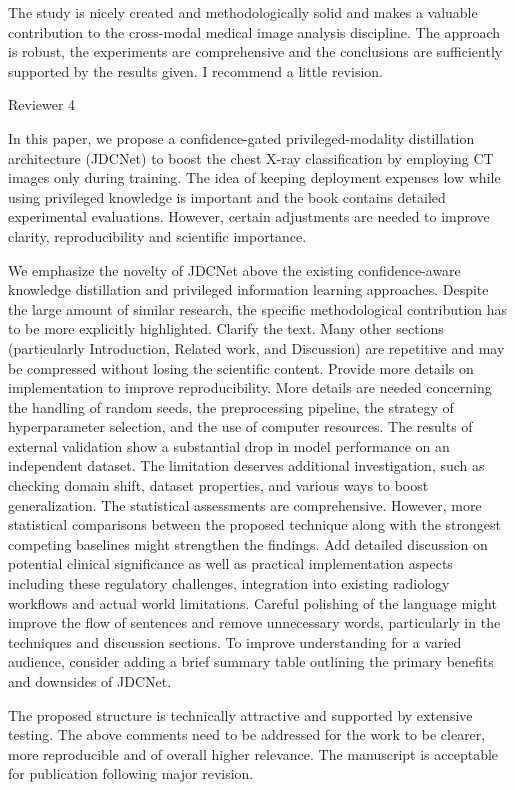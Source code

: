 {The study is nicely created and methodologically solid and makes a valuable contribution to the cross-modal medical image analysis discipline. The approach is robust, the experiments are comprehensive and the conclusions are sufficiently supported by the results given. I recommend a little revision.

Reviewer 4

In this paper, we propose a confidence-gated privileged-modality distillation architecture (JDCNet) to boost the chest X-ray classification by employing CT images only during training. The idea of keeping deployment expenses low while using privileged knowledge is important and the book contains detailed experimental evaluations. However, certain adjustments are needed to improve clarity, reproducibility and scientific importance.

We emphasize the novelty of JDCNet above the existing confidence-aware knowledge distillation and privileged information learning approaches. Despite the large amount of similar research, the specific methodological contribution has to be more explicitly highlighted.
Clarify the text. Many other sections (particularly Introduction, Related work, and Discussion) are repetitive and may be compressed without losing the scientific content.
Provide more details on implementation to improve reproducibility. More details are needed concerning the handling of random seeds, the preprocessing pipeline, the strategy of hyperparameter selection, and the use of computer resources.
The results of external validation show a substantial drop in model performance on an independent dataset. The limitation deserves additional investigation, such as checking domain shift, dataset properties, and various ways to boost generalization.
The statistical assessments are comprehensive. However, more statistical comparisons between the proposed technique along with the strongest competing baselines might strengthen the findings.
Add detailed discussion on potential clinical significance as well as practical implementation aspects including these regulatory challenges, integration into existing radiology workflows and actual world limitations.
Careful polishing of the language might improve the flow of sentences and remove unnecessary words, particularly in the techniques and discussion sections.
To improve understanding for a varied audience, consider adding a brief summary table outlining the primary benefits and downsides of JDCNet.

The proposed structure is technically attractive and supported by extensive testing. The above comments need to be addressed for the work to be clearer, more reproducible and of overall higher relevance. The manuscript is acceptable for publication following major revision.

}
